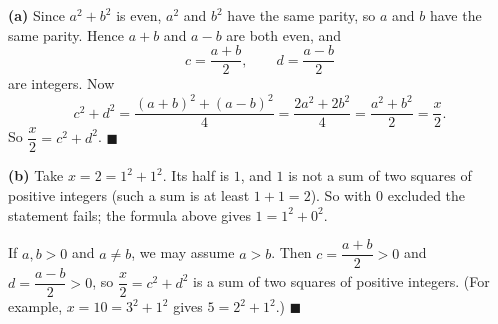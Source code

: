 \textbf{(a)} Since $a^2+b^2$ is even, $a^2$ and $b^2$ have the same parity, so $a$ and $b$ have the same parity. Hence $a+b$ and $a-b$ are both even, and
\[
c=\dfrac{a+b}{2},\qquad d=\dfrac{a-b}{2}
\]
are integers. Now
\[
c^2+d^2=\dfrac{(a+b)^2+(a-b)^2}{4}=\dfrac{2a^2+2b^2}{4}=\dfrac{a^2+b^2}{2}=\dfrac {x}{2} .
\]
So $\dfrac {x}{2}=c^2+d^2$. $\blacksquare$

\textbf{(b)} Take $x=2=1^2+1^2$. Its half is $1$, and $1$ is not a sum of two squares of positive integers (such a sum is at least $1+1=2$). So with $0$ excluded the statement fails; the formula above gives $1=1^2+0^2$.

If $a,b>0$ and $a\ne b$, we may assume $a>b$. Then $c=\dfrac{a+b}{2}>0$ and $d=\dfrac{a-b}{2}>0$, so $\dfrac {x}{2}=c^2+d^2$ is a sum of two squares of positive integers. (For example, $x=10=3^2+1^2$ gives $5=2^2+1^2$.) $\blacksquare$
